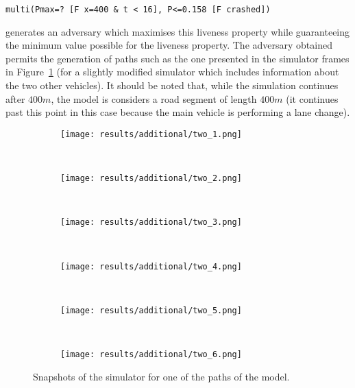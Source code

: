 \begin{minipage}{\linewidth}
{\vspace{1em}
\begin{lstlisting}
multi(Pmax=? [F x=400 & t < 16], P<=0.158 [F crashed])
\end{lstlisting}
}
\end{minipage}

generates an adversary which maximises this liveness property while guaranteeing the minimum value possible for the liveness property. The adversary obtained permits the generation of paths such as the one presented in the simulator frames in Figure~\ref{fig:three_vehicle_sim} (for a slightly modified simulator which includes information about the two other vehicles). It should be noted that, while the simulation continues after $400m$, the model is considers a road segment of length $400m$ (it continues past this point in this case because the main vehicle is performing a lane change).

\begin{figure}[H]
\centering
\begin{subfigure}{0.75\textwidth}
  \centering
  \texttt{[image: results/additional/two\_1.png]}
\end{subfigure}\\ \vspace{2px}
\begin{subfigure}{0.75\textwidth}
  \centering
  \texttt{[image: results/additional/two\_2.png]}
\end{subfigure} \\ \vspace{2px}
\begin{subfigure}{0.75\textwidth}
  \centering
  \texttt{[image: results/additional/two\_3.png]}
\end{subfigure} \\ \vspace{2px}
\begin{subfigure}{0.75\textwidth}
  \centering
  \texttt{[image: results/additional/two\_4.png]}
\end{subfigure} \\ \vspace{2px}
\begin{subfigure}{0.75\textwidth}
  \centering
  \texttt{[image: results/additional/two\_5.png]}
\end{subfigure} \\ \vspace{2px}
\begin{subfigure}{0.75\textwidth}
  \centering
  \texttt{[image: results/additional/two\_6.png]}
\end{subfigure}
\caption{Snapshots of the simulator for one of the paths of the model.}
\label{fig:three_vehicle_sim}
\end{figure}





